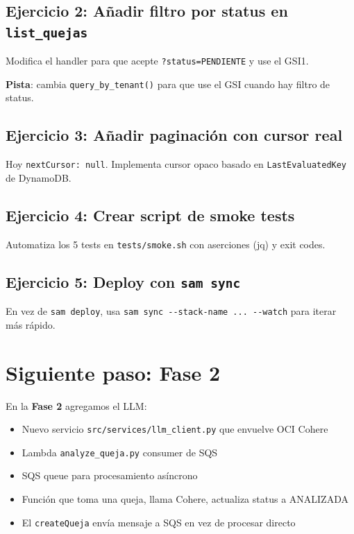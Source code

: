 \documentclass[11pt,a4paper,oneside]{article}
\newcommand{\filename}[1]{\texttt{\small #1}}
\begin{document}
\subsection{Ejercicio 2: A\~nadir filtro por status en \texttt{list\_quejas}}

Modifica el handler para que acepte \texttt{?status=PENDIENTE} y use el GSI1.

\textbf{Pista}: cambia \texttt{query\_by\_tenant()} para que use el GSI cuando hay filtro de status.

\subsection{Ejercicio 3: A\~nadir paginaci\'on con cursor real}

Hoy \texttt{nextCursor: null}. Implementa cursor opaco basado en \texttt{LastEvaluatedKey} de DynamoDB.

\subsection{Ejercicio 4: Crear script de smoke tests}

Automatiza los 5 tests en \filename{tests/smoke.sh} con aserciones (jq) y exit codes.

\subsection{Ejercicio 5: Deploy con \texttt{sam sync}}

En vez de \texttt{sam deploy}, usa \texttt{sam sync -{}-stack-name ... -{}-watch} para iterar m\'as r\'apido.

\section{Siguiente paso: Fase 2}

En la \textbf{Fase 2} agregamos el LLM:

\begin{itemize}
  \item Nuevo servicio \texttt{src/services/llm\_client.py} que envuelve OCI Cohere
  \item Lambda \texttt{analyze\_queja.py} consumer de SQS
  \item SQS queue para procesamiento as\'incrono
  \item Funci\'on que toma una queja, llama Cohere, actualiza status a ANALIZADA
  \item El \texttt{createQueja} env\'ia mensaje a SQS en vez de procesar directo
\end{itemize}
\end{document}

